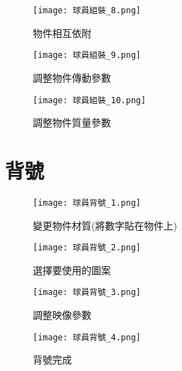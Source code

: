 \begin{figure}[hbt!]
  \begin{center}
    \texttt{[image: 球員組裝\_8.png]}
  \end{center}
  \caption{物件相互依附}
  \label{fig:photo}
\end{figure}

\begin{figure}[hbt!]
  \begin{center}
    \texttt{[image: 球員組裝\_9.png]}
  \end{center}
  \caption{調整物件傳動參數}
  \label{fig:photo}
\end{figure}

\begin{figure}[hbt!]
  \begin{center}
    \texttt{[image: 球員組裝\_10.png]}
  \end{center}
  \caption{調整物件質量參數}
  \label{fig:photo}
\end{figure}

\section{背號}
\begin{figure}[hbt!]
  \begin{center}
    \texttt{[image: 球員背號\_1.png]}
  \end{center}
  \caption{變更物件材質(將數字貼在物件上)}
  \label{fig:photo}
\end{figure}
\begin{figure}[hbt!]
  \begin{center}
    \texttt{[image: 球員背號\_2.png]}
  \end{center}
  \caption{選擇要使用的圖案}
  \label{fig:photo}
\end{figure}
\begin{figure}[hbt!]
  \begin{center}
    \texttt{[image: 球員背號\_3.png]}
  \end{center}
  \caption{調整映像參數}
  \label{fig:photo}
\end{figure}
\begin{figure}[hbt!]
  \begin{center}
    \texttt{[image: 球員背號\_4.png]}
  \end{center}
  \caption{背號完成}
  \label{fig:photo}
\end{figure}

